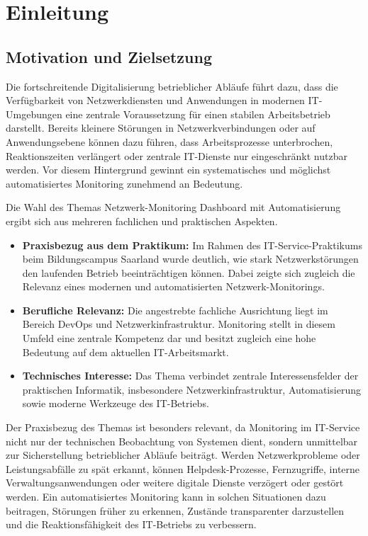 \chapter{Einleitung}

\section{Motivation und Zielsetzung}

Die fortschreitende Digitalisierung betrieblicher Abläufe führt dazu, dass die Verfügbarkeit von Netzwerkdiensten und Anwendungen in modernen IT-Umgebungen eine zentrale Voraussetzung für einen stabilen Arbeitsbetrieb darstellt. Bereits kleinere Störungen in Netzwerkverbindungen oder auf Anwendungsebene können dazu führen, dass Arbeitsprozesse unterbrochen, Reaktionszeiten verlängert oder zentrale IT-Dienste nur eingeschränkt nutzbar werden. Vor diesem Hintergrund gewinnt ein systematisches und möglichst automatisiertes Monitoring zunehmend an Bedeutung. 

Die Wahl des Themas \glqq Netzwerk-Monitoring Dashboard mit Automatisierung\grqq{} ergibt sich aus mehreren fachlichen und praktischen Aspekten. 

\begin{itemize}
    \item \textbf{Praxisbezug aus dem Praktikum:} Im Rahmen des IT-Service-Praktikums beim Bildungscampus Saarland wurde deutlich, wie stark Netzwerkstörungen den laufenden Betrieb beeinträchtigen können. Dabei zeigte sich zugleich die Relevanz eines modernen und automatisierten Netzwerk-Monitorings. 
    
    \item \textbf{Berufliche Relevanz:} Die angestrebte fachliche Ausrichtung liegt im Bereich DevOps und Netzwerkinfrastruktur. Monitoring stellt in diesem Umfeld eine zentrale Kompetenz dar und besitzt zugleich eine hohe Bedeutung auf dem aktuellen IT-Arbeitsmarkt. 
    
    \item \textbf{Technisches Interesse:} Das Thema verbindet zentrale Interessensfelder der praktischen Informatik, insbesondere Netzwerkinfrastruktur, Automatisierung sowie moderne Werkzeuge des IT-Betriebs. 
\end{itemize}

Der Praxisbezug des Themas ist besonders relevant, da Monitoring im IT-Service nicht nur der technischen Beobachtung von Systemen dient, sondern unmittelbar zur Sicherstellung betrieblicher Abläufe beiträgt. Werden Netzwerkprobleme oder Leistungsabfälle zu spät erkannt, können Helpdesk-Prozesse, Fernzugriffe, interne Verwaltungsanwendungen oder weitere digitale Dienste verzögert oder gestört werden. Ein automatisiertes Monitoring kann in solchen Situationen dazu beitragen, Störungen früher zu erkennen, Zustände transparenter darzustellen und die Reaktionsfähigkeit des IT-Betriebs zu verbessern.  

